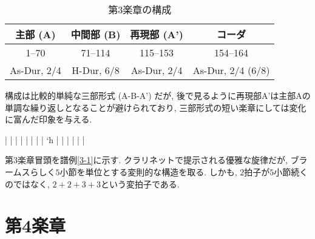 \begin{table}[htbp]
	\centering
	\begin{tabular}{cccc}
		主部 (A) & 中間部 (B) & 再現部 (A') & コーダ \\ \hline
		1--70 & 71--114 & 115--153 & 154--164 \\
		As-Dur, 2/4 & H-Dur, 6/8 & As-Dur, 2/4 & As-Dur, 2/4 (6/8)
	\end{tabular}
	\caption{第3楽章の構成}
	\label{structure of mov3}
\end{table}
構成は比較的単純な三部形式 (A-B-A') だが, 後で見るように再現部A'は主部Aの単調な繰り返しとなることが避けられており,
三部形式の短い楽章にしては変化に富んだ印象を与える.

\musicbegin
	\def\nbinstruments{1}%
	\startextract%
		\Notes\cmidstaff{\p}|
			\enotes
		\Notes{}|
			\enotes
		\bar
		\NOtes{}|
			\enotes
		\bar
		\NOtes{}|
			\enotes
		\bar
		\Notes{}|
			\lq{h}\enotes
		\Notes{}|
			\enotes
		\bar
		\Notes{}|
			\enotes
		\Notes{}|
			\enotes
		\Notes{}|
			\enotes
		\Notes{}|
			\enotes
	\endextract %

第3楽章冒頭を譜例\ref{3-1}に示す. クラリネットで提示される優雅な旋律だが, ブラームスらしく$5$小節を単位とする変則的な構造を取る.
しかも, $2$拍子が$5$小節続くのではなく, $2 + 2 + 3 + 3$という変拍子である.


\section{第4楽章}
